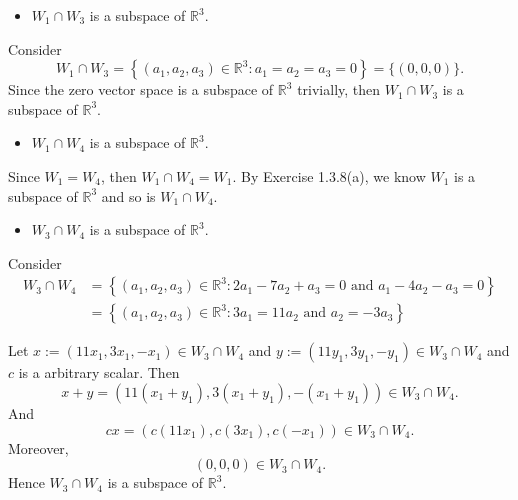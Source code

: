 \begin{Exercise}
\begin{itemize}
\item $W_1\cap W_3$ is a subspace of $\mathbb{R}^3$.
\end{itemize}
\begin{solution}
Consider
$$
W_1\cap W_3 = \left\{(a_1, a_2, a_3)\in\mathbb{R}^3: a_1 = a_2 = a_3 = 0\right\}
= \{(0,0,0)\}.
$$
Since the zero vector space is a subspace of $\mathbb{R}^3$ trivially, then $W_1\cap W_3$ is a subspace of $\mathbb{R}^3$.
\end{solution}

\begin{itemize}
\item $W_1\cap W_4$ is a subspace of $\mathbb{R}^3$.
\end{itemize}
\begin{solution}
Since $W_1 = W_4$, then $W_1\cap W_4 = W_1$. By Exercise 1.3.8(a), we know $W_1$ is a subspace of $\mathbb{R}^3$ and so is $W_1\cap W_4$.
\end{solution}

\begin{itemize}
\item $W_3\cap W_4$ is a subspace of $\mathbb{R}^3$.
\end{itemize}
\begin{solution}
Consider
\begin{align*}
W_3\cap W_4 
&= \left\{(a_1, a_2, a_3)\in\mathbb{R}^3: 2a_1-7a_2+a_3 = 0\text{ and } a_1-4a_2-a_3 = 0\right\} \\
&= \left\{(a_1, a_2, a_3)\in\mathbb{R}^3: 3a_1 = 11a_2\text{ and } a_2=-3a_3\right\}
\end{align*}

Let $x := (11x_1,3x_1,-x_1)\in W_3\cap W_4 $ and $y := (11y_1,3y_1,-y_1)\in W_3\cap W_4 $ and $c$ is a arbitrary scalar. Then
$$
x+y
= (11(x_1+y_1), 3(x_1+y_1), -(x_1+y_1)) \in W_3\cap W_4.
$$
And
$$
c x
= (c (11x_1), c (3x_1), c(-x_1)) \in W_3\cap W_4.
$$
Moreover,
$$
(0,0,0) \in W_3\cap W_4.
$$
Hence $W_3\cap W_4$ is a subspace of $\mathbb{R}^3$.
\end{solution}

\end{Exercise}